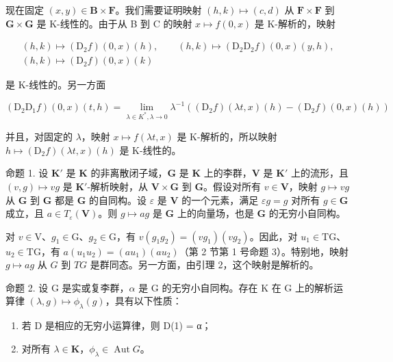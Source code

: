 现在固定 \((x,y)\in \mathbf{B}\times \mathbf{F}\)。我们需要证明映射 \((h,k)\mapsto (c,d)\) 从 \(\mathbf{F}\times \mathbf{F}\) 到 \(\mathbf{G}\times \mathbf{G}\) 是 K-线性的。由于从 B 到 C 的映射 \(x\mapsto f(0,x)\) 是 K-解析的，映射

\[
\begin{array}{c} (h, k) \mapsto (\mathrm{D} _ {2} f) (0, x) (h), \qquad (h, k) \mapsto (\mathrm{D} _ {2} \mathrm{D} _ {2} f) (0, x) (y, h), \\ (h, k) \mapsto (\mathrm{D} _ {2} f) (0, x) (k) \end{array}
\]

是 K-线性的。另一方面

\[
\left(\mathrm{D} _ {2} \mathrm{D} _ {1} f\right) (0, x) (t, h) = \lim _ {\lambda \in K ^ {*}, \lambda \rightarrow 0} \lambda^ {- 1} \left(\left(\mathrm{D} _ {2} f\right) (\lambda t, x) (h) - \left(\mathrm{D} _ {2} f\right) (0, x) (h)\right)
\]

并且，对固定的 \(\lambda\)，映射 \(x \mapsto f(\lambda t, x)\) 是 K-解析的，所以映射 \(h \mapsto (\mathrm{D}_2f)(\lambda t, x)(h)\) 是 K-线性的。

命题 1. 设 \(\mathbf{K}'\) 是 \(\mathbf{K}\) 的非离散闭子域，\(\mathbf{G}\) 是 \(\mathbf{K}\) 上的李群，\(\mathbf{V}\) 是 \(\mathbf{K}'\) 上的流形，且 \((v, g) \mapsto vg\) 是 \(\mathbf{K}'\)-解析映射，从 \(\mathbf{V} \times \mathbf{G}\) 到 \(\mathbf{G}\)。假设对所有 \(v \in \mathbf{V}\)，映射 \(g \mapsto vg\) 从 \(\mathbf{G}\) 到 \(\mathbf{G}\) 都是 \(\mathbf{G}\) 的自同构。设 \(\varepsilon\) 是 \(\mathbf{V}\) 的一个元素，满足 \(\varepsilon g = g\) 对所有 \(g \in \mathbf{G}\) 成立，且 \(a \in T_{\varepsilon}(\mathbf{V})\)。则 \(g \mapsto ag\) 是 \(\mathbf{G}\) 上的向量场，也是 \(\mathbf{G}\) 的无穷小自同构。

对 \(v \in \mathrm{V}\)、\(g_1 \in \mathrm{G}\)、\(g_2 \in \mathrm{G}\)，有 \(v(g_1g_2) = (vg_1)(vg_2)\)。因此，对 \(u_1 \in \mathrm{TG}\)、\(u_2 \in \mathrm{TG}\)，有 \(a(u_1u_2) = (au_1)(au_2)\)（第 2 节第 1 号命题 3）。特别地，映射 \(g \mapsto ag\) 从 \(G\) 到 \(TG\) 是群同态。另一方面，由引理 2，这个映射是解析的。

命题 2. 设 G 是实或复李群，\(\alpha\) 是 G 的无穷小自同构。存在 K 在 G 上的解析运算律 \((\lambda, g) \mapsto \phi_{\lambda}(g)\)，具有以下性质：

\begin{enumerate}
\def\labelenumi{(\arabic{enumi})}
\item
  若 D 是相应的无穷小运算律，则 D(1) = α；
\item
  对所有 \(\lambda \in \mathbf{K}\)，\(\phi_{\lambda} \in \operatorname{Aut} G\)。
\end{enumerate}

